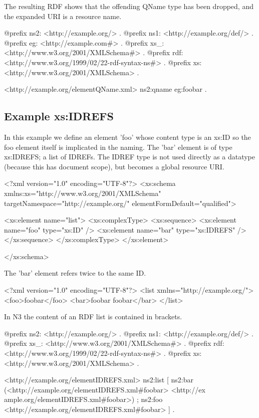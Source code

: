 The resulting RDF shows that the offending QName type has been dropped, and the expanded URI is a resource name.


\begin{DoxyCodeInclude}
@prefix ns2:     <http://example.org/> .
@prefix ns1:     <http://example.org/def/> .
@prefix eg:      <http://example.com#> .
@prefix xs_:     <http://www.w3.org/2001/XMLSchema#> .
@prefix rdf:     <http://www.w3.org/1999/02/22-rdf-syntax-ns#> .
@prefix xs:      <http://www.w3.org/2001/XMLSchema> .

<http://example.org/elementQName.xml>
      ns2:qname eg:foobar .
\end{DoxyCodeInclude}
 \hypertarget{elementIDREFS}{}\subsection{Example xs:IDREFS}\label{elementIDREFS}
In this example we define an element 'foo' whose content type is an xs:ID so the foo element itself is implicated in the naming. The 'bar' element is of type xs:IDREFS; a list of IDREFs. The IDREF type is not used directly as a datatype (because this has document scope), but becomes a global resource URI.


\begin{DoxyCodeInclude}
<?xml version="1.0" encoding="UTF-8"?>
<xs:schema xmlns:xs="http://www.w3.org/2001/XMLSchema" 
        targetNamespace="http://example.org/" elementFormDefault="qualified">
        
        <xs:element name="list">
                <xs:complexType>
                        <xs:sequence>
                                <xs:element name="foo" type="xs:ID" />
                                <xs:element name="bar" type="xs:IDREFS" />
                        </xs:sequence>
                </xs:complexType>
        </xs:element>

</xs:schema>
\end{DoxyCodeInclude}


The 'bar' element refers twice to the same ID. 
\begin{DoxyCodeInclude}
<?xml version="1.0" encoding="UTF-8"?>
<list xmlns="http://example.org/">
        <foo>foobar</foo>
        <bar>foobar foobar</bar>
</list>
\end{DoxyCodeInclude}


In N3 the content of an RDF list is contained in brackets. 
\begin{DoxyCodeInclude}
@prefix ns2:     <http://example.org/> .
@prefix ns1:     <http://example.org/def/> .
@prefix xs_:     <http://www.w3.org/2001/XMLSchema#> .
@prefix rdf:     <http://www.w3.org/1999/02/22-rdf-syntax-ns#> .
@prefix xs:      <http://www.w3.org/2001/XMLSchema> .

<http://example.org/elementIDREFS.xml>
      ns2:list
              [ ns2:bar (<http://example.org/elementIDREFS.xml#foobar> <http://ex
      ample.org/elementIDREFS.xml#foobar>) ;
                ns2:foo <http://example.org/elementIDREFS.xml#foobar>
              ] .
\end{DoxyCodeInclude}
 